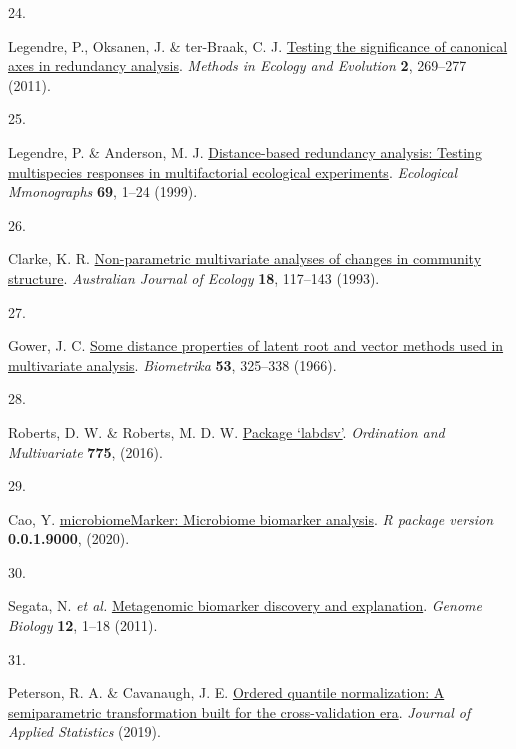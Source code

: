 \documentclass[
  10pt,
  letterpaper,
  DIV=11,
  numbers=noendperiod]{scrartcl}
\newlength{\cslhangindent}
\newlength{\csllabelwidth}
\newlength{\cslentryspacingunit} %
\newenvironment{CSLReferences}[2] %
 {%
  \setlength{\parindent}{0pt}
  \ifodd #1
  \let\oldpar\par
  \def\par{\hangindent=\cslhangindent\oldpar}
  \fi
  \setlength{\parskip}{#2\cslentryspacingunit}
 }%
 {}
\newcommand{\CSLLeftMargin}[1]{\parbox[t]{\csllabelwidth}{#1}}
\newcommand{\CSLRightInline}[1]{\parbox[t]{\linewidth - \csllabelwidth}{#1}\break}
\begin{document}
\begin{CSLReferences}{0}{0}
\leavevmode{}%
\CSLLeftMargin{24. }%
\CSLRightInline{Legendre, P., Oksanen, J. \& ter-Braak, C. J.
\href{https://doi.org/10.1111/j.2041-210X.2010.00078.x}{Testing the
significance of canonical axes in redundancy analysis}. \emph{Methods in
Ecology and Evolution} \textbf{2}, 269--277 (2011).}

\leavevmode{}%
\CSLLeftMargin{25. }%
\CSLRightInline{Legendre, P. \& Anderson, M. J.
\href{https://doi.org/10.1890/0012-9615(1999)069\%5B0001:DBRATM\%5D2.0.CO;2}{Distance-based
redundancy analysis: Testing multispecies responses in multifactorial
ecological experiments}. \emph{Ecological Mmonographs} \textbf{69},
1--24 (1999).}

\leavevmode{}%
\CSLLeftMargin{26. }%
\CSLRightInline{Clarke, K. R.
\href{https://doi.org/10.1111/j.1442-9993.1993.tb00438.x}{Non-parametric
multivariate analyses of changes in community structure}.
\emph{Australian Journal of Ecology} \textbf{18}, 117--143 (1993).}

\leavevmode{}%
\CSLLeftMargin{27. }%
\CSLRightInline{Gower, J. C.
\href{https://doi.org/10.1093/biomet/53.3-4.325}{Some distance
properties of latent root and vector methods used in multivariate
analysis}. \emph{Biometrika} \textbf{53}, 325--338 (1966).}

\leavevmode{}%
\CSLLeftMargin{28. }%
\CSLRightInline{Roberts, D. W. \& Roberts, M. D. W.
\href{https://cran.r-project.org/web/packages/labdsv/index.html}{Package
{`labdsv'}}. \emph{Ordination and Multivariate} \textbf{775}, (2016).}

\leavevmode{}%
\CSLLeftMargin{29. }%
\CSLRightInline{Cao, Y.
\href{https://doi.org/10.5281/zenodo.3749415}{microbiomeMarker:
Microbiome biomarker analysis}. \emph{R package version}
\textbf{0.0.1.9000}, (2020).}

\leavevmode{}%
\CSLLeftMargin{30. }%
\CSLRightInline{Segata, N. \emph{et al.}
\href{https://doi.org/10.1186/gb-2011-12-6-r60}{Metagenomic biomarker
discovery and explanation}. \emph{Genome Biology} \textbf{12}, 1--18
(2011).}

\leavevmode{}%
\CSLLeftMargin{31. }%
\CSLRightInline{Peterson, R. A. \& Cavanaugh, J. E.
\href{https://doi.org/10.1080/02664763.2019.1630372}{Ordered quantile
normalization: A semiparametric transformation built for the
cross-validation era}. \emph{Journal of Applied Statistics} (2019).}


\end{CSLReferences}
\end{document}
